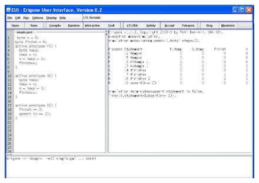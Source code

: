\documentclass[11pt]{article}
\begin{document}
\begin{figure}[tb]
\begin{center}
\includegraphics[width=140mm]{eui}
\end{center}
\end{figure}
\end{document}
